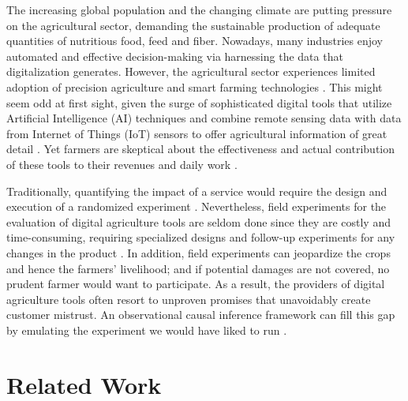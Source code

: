 \documentclass[letterpaper]{article} %
\begin{document}


The increasing global population and the changing climate are putting pressure on the agricultural sector, demanding the sustainable production of adequate quantities of nutritious food, feed and fiber. Nowadays, many industries enjoy automated and effective decision-making via harnessing the data that digitalization generates. However, the agricultural sector experiences limited adoption of precision agriculture and smart farming technologies \cite{gabriel2022adoption}. This might seem odd at first sight, given the surge of sophisticated digital tools that utilize Artificial Intelligence (AI) techniques and combine remote sensing data with data from Internet of Things (IoT) sensors to offer agricultural information of great detail \cite{sharma2020machine, nanushi2022pest, choumos2022towards}.
Yet farmers are skeptical about the effectiveness and actual contribution of these tools to their revenues and daily work \cite{lowenberg2019setting, lioutas2021digitalization}.

Traditionally, quantifying the impact of a service would require the design and execution of a randomized experiment \cite{boruch1997randomized}. Nevertheless, field experiments for the evaluation of digital agriculture tools are seldom done since they are costly and time-consuming, requiring specialized designs and follow-up experiments for any changes in the product \cite{vaessen2010challenges, diggleexperimental}. In addition, field experiments can jeopardize the crops and hence the farmers' livelihood; and if potential damages are not covered, no prudent farmer would want to participate. As a result, the providers of digital agriculture tools often resort to unproven promises that unavoidably create customer mistrust. An observational causal inference framework \cite{pearl2009causality} can fill this gap by emulating the experiment we would have liked to run \cite{hernan2016using}.

\section{Related Work}
\end{document}
